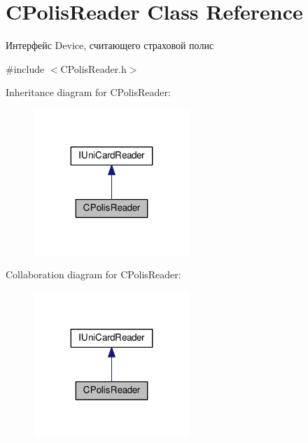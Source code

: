 \hypertarget{classCPolisReader}{}\section{C\+Polis\+Reader Class Reference}
\label{classCPolisReader}


Интерфейс Device, считающего страховой полис  




{\ttfamily \#include $<$C\+Polis\+Reader.\+h$>$}



Inheritance diagram for C\+Polis\+Reader\+:\nopagebreak
\begin{figure}[H]
\begin{center}
\leavevmode
\includegraphics[width=167pt]{classCPolisReader__inherit__graph}
\end{center}
\end{figure}


Collaboration diagram for C\+Polis\+Reader\+:\nopagebreak
\begin{figure}[H]
\begin{center}
\leavevmode
\includegraphics[width=167pt]{classCPolisReader__coll__graph}
\end{center}
\end{figure}
